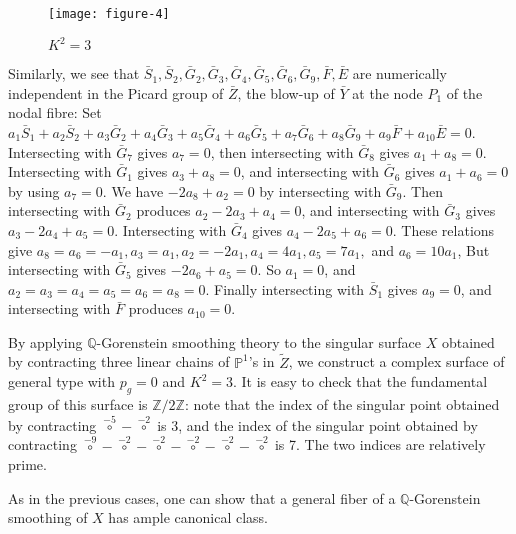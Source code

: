 \documentclass[twoside,11pt]{amsart}
\begin{document}
{\medskip}
\begin{figure}
\centering
\texttt{[image: figure-4]}
\caption{$K^2=3$}
\label{figure:K^2=3}
\end{figure}

{\medskip} Similarly, we see that $\bar S_1, \bar S_2, \bar G_2, \bar G_3,
\bar G_4, \bar G_5, \bar G_6, \bar G_9, \bar F, \bar E$ are
numerically independent in the Picard group of $\bar Z$, the
blow-up of $\bar Y$ at the node $P_1$ of the nodal fibre: Set
$a_1\bar S_1+a_2\bar S_2+a_3\bar G_2+a_4\bar G_3+a_5\bar
G_4+a_6\bar G_5+a_7\bar G_6+a_8\bar G_9+a_9\bar F+a_{10}\bar E=0$.
Intersecting with $\bar G_7$ gives $a_7=0$, then intersecting with
$\bar G_8$ gives $a_1+a_8=0$. Intersecting with $\bar G_1$ gives
$a_3+a_8=0$, and intersecting with $\bar G_6$ gives $a_1+a_6=0$ by
using $a_7=0$. We have $-2a_8+a_2=0$ by intersecting with $\bar
G_9$. Then intersecting with $\bar G_2$ produces $a_2-2a_3+a_4=0$,
and intersecting with $\bar G_3$ gives $a_3-2a_4+a_5=0$.
Intersecting with $\bar G_4$ gives $a_4-2a_5+a_6=0$. These
relations give $a_8=a_6=-a_1, a_3=a_1, a_2=-2a_1, a_4=4a_1,
a_5=7a_1,$ and $a_6=10a_1$, But intersecting with $\bar G_5$ gives
$-2a_6+a_5=0$. So $a_1=0$, and $a_2=a_3=a_4=a_5=a_6=a_8=0$.
Finally intersecting with $\bar S_1$ gives $a_9=0$, and
intersecting with $\bar F$ produces $a_{10}=0$.

By applying ${{\mathbb Q}}$-Gorenstein smoothing theory to the singular
surface $X$ obtained by contracting three linear chains of
${{\mathbb P}}^1$'s in $\tilde Z$, we construct a complex surface of general
type with $p_g=0$ and $K^2=3$. It is easy to check that the
fundamental group of this surface is ${{\mathbb Z}}/2{{\mathbb Z}}$: note that the
index of the singular point obtained by contracting
${\overset{-5}{\circ}}-{\overset{-2}{\circ}}$ is 3, and the index
of the singular point obtained by contracting
${\overset{-9}{\circ}}-{\overset{-2}{\circ}}-{\overset{-2}{\circ}}
-{\overset{-2}{\circ}}-{\overset{-2}{\circ}}-{\overset{-2}{\circ}}$
is 7. The two indices are relatively prime.

As in the previous cases, one can show that a general fiber of a
${{\mathbb Q}}$-Gorenstein smoothing of $X$ has ample canonical class.
\end{document}
